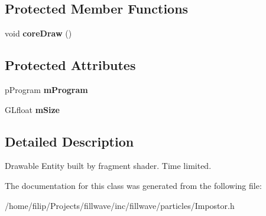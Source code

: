 \subsection*{Protected Member Functions}
\begin{DoxyCompactItemize}
\item 
\hypertarget{classfillwave_1_1particles_1_1Impostor_a2f15380e3bb0bfe858beb3f907c1d9b7}{}void {\bfseries core\+Draw} ()\label{classfillwave_1_1particles_1_1Impostor_a2f15380e3bb0bfe858beb3f907c1d9b7}

\end{DoxyCompactItemize}
\subsection*{Protected Attributes}
\begin{DoxyCompactItemize}
\item 
\hypertarget{classfillwave_1_1particles_1_1Impostor_a53809584e50549b81179d1a364271fe1}{}p\+Program {\bfseries m\+Program}\label{classfillwave_1_1particles_1_1Impostor_a53809584e50549b81179d1a364271fe1}

\item 
\hypertarget{classfillwave_1_1particles_1_1Impostor_a4c0d1d324afd9ed7a50f93237d3c2481}{}G\+Lfloat {\bfseries m\+Size}\label{classfillwave_1_1particles_1_1Impostor_a4c0d1d324afd9ed7a50f93237d3c2481}

\end{DoxyCompactItemize}


\subsection{Detailed Description}
Drawable Entity built by fragment shader. Time limited. 

The documentation for this class was generated from the following file\+:\begin{DoxyCompactItemize}
\item 
/home/filip/\+Projects/fillwave/inc/fillwave/particles/Impostor.\+h\end{DoxyCompactItemize}
